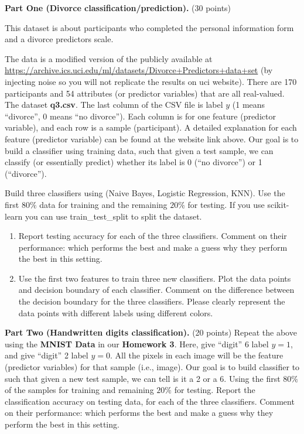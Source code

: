 \documentclass[twoside,10pt]{article}
\begin{document}
\begin{enumerate}
\textbf{Part One (Divorce classification/prediction).} (30 points) 

This dataset is about participants who completed the personal information form and a divorce predictors scale. 

The data is a modified version of the publicly available at \url{https://archive.ics.uci.edu/ml/datasets/Divorce+Predictors+data+set} (by injecting noise so you will not replicate the results on uci website). There are 170 participants and 54 attributes (or predictor variables) that are all real-valued. The dataset \textbf{q3.csv}. The last column of the CSV file is label $y$ (1 means ``divorce'', 0 means ``no divorce''). Each column is for one feature (predictor variable), and each row is a sample (participant). A detailed explanation for each feature (predictor variable) can be found at the website link above. Our goal is to build a classifier using training data, such that given a test sample, we can classify (or essentially predict) whether its label is 0 (``no divorce'') or 1 (``divorce''). 



Build three classifiers using (Naive Bayes, Logistic Regression, KNN). Use the first $80\%$ data for training and the remaining $20\%$ for testing. If you use \textsf{scikit-learn} you can use \textsf{train\_test\_split} to split the dataset. 

\begin{enumerate}

	\item Report testing accuracy for each of the three classifiers.  Comment on their performance: which performs the best and make a guess why they perform the best in this setting. 
	\item Use the first two features to train three new classifiers. Plot the data points and decision boundary of each classifier. Comment on the difference between the decision boundary for the three classifiers. Please clearly represent the data points with different labels using different colors.
\end{enumerate}

\textbf{Part Two (Handwritten digits classification).} (20 points) Repeat the above using the \textbf{MNIST Data} in our \textbf{Homework 3}. Here, give ``digit'' 6 label $y = 1$, and give ``digit'' 2 label $y = 0$. All the pixels in each image will be the feature (predictor variables) for that sample (i.e., image). Our goal is to build classifier to such that given a new test sample, we can tell is it a 2 or a 6. Using the first $80\%$ of the samples for training and remaining $20\%$ for testing. Report the classification accuracy on testing data, for each of the three classifiers. Comment on their performance: which performs the best and make a guess why they perform the best in this setting. 


\end{enumerate}
\end{document}
